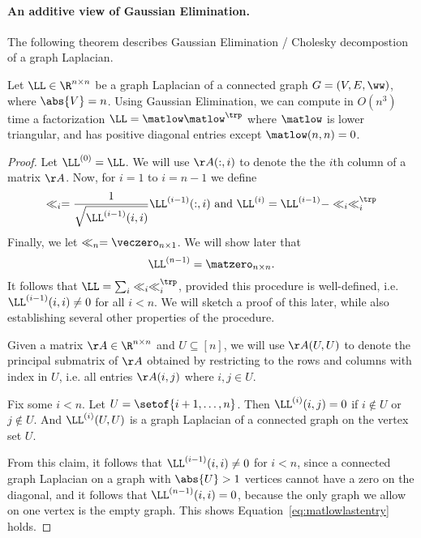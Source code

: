 \paragraph{An additive view of Gaussian Elimination.}
The following theorem describes Gaussian Elimination / Cholesky
decompostion of a graph Laplacian.
\begin{theorem}
 Let $\LL
 \in \R^{n \times n}$ be a graph Laplacian of a connected
 graph $G = (V,E,\ww)$, where
$\abs{V} = n$.
 Using Gaussian Elimination, we can compute in $O(n^3)$ time a
 factorization $\LL = \matlow\matlow^{\trp}$ where $\matlow$ is lower
 triangular, and has positive diagonal entries except $\matlow(n,n) = 0$.
\end{theorem}
\begin{proof}
  Let $\LL^{(0)} = \LL$.
We will use $\AA(:,i)$ to denote the the $i$th column of a matrix $\AA$.
Now, for $i = 1$ to $i = n-1$ we define
\[
  \ll_i = \frac{1}{\sqrt{\LL^{(i-1)}(i,i)}} \LL^{(i-1)}(:,i)
  \text{ and }
   \LL^{(i)}  = \LL^{(i-1)} - \ll_i \ll_i^{\trp}
 \]
 Finally, we let $\ll_n = \veczero_{n \times 1}$.
 We will show later that
 \begin{equation}
   \label{eq:matlowlastentry}
   \LL^{(n-1)} = \matzero_{n \times n}.
 \end{equation}
 It follows that $\LL = \sum_{i} \ll_i \ll_i^{\trp}$, provided this
 procedure is well-defined, i.e. $\LL^{(i-1)}(i,i) \neq 0$ for all $i
< n$. We will sketch a proof of this later, while also establishing
several other properties of the procedure.

Given a matrix $\AA \in \R^{n \times n}$ and $U \subseteq [n]$, we will use $\AA(U, U)$ to
denote the principal submatrix of $\AA$ obtained by restricting to the
rows and columns with index in $U$, i.e. all entries $\AA(i,j)$ where
$i,j \in U$.
\begin{claim}
  \label{clm:schurconnected}
  Fix some $i < n$.
  Let $U = \setof{i+1,\ldots,n}$.
  Then $\LL^{(i)}(i,j) = 0$ if $i \not\in U$ or $j \not\in U$.
  And $\LL^{(i)}(U, U)$ is a graph Laplacian of a connected graph on
  the vertex set $U$.
\end{claim}
From this claim, it follows that $\LL^{(i-1)}(i,i) \neq 0$ for $i<n$,
since a connected graph Laplacian on a graph with $\abs{U} > 1$
vertices cannot have a zero on the diagonal, and it follows that
$\LL^{(n-1)}(i,i) = 0$, because the only graph we allow on one vertex
is the empty graph. This shows Equation~\eqref{eq:matlowlastentry} holds.
\end{proof}

